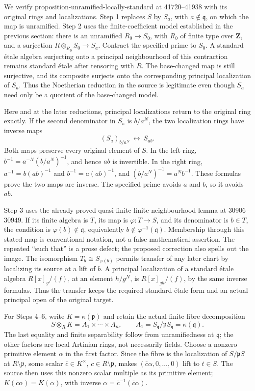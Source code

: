 We verify proposition-unramified-locally-standard at 41720--41938 with its original rings and localizations. Step 1 replaces \(S\) by \(S_a\), with \(a\notin\mathfrak q\), on which the map is unramified. Step 2 uses the finite-coefficient model established in the previous section: there is an unramified \(R_0\to S_0\), with \(R_0\) of finite type over \(\mathbf Z\), and a surjection \(R\otimes_{R_0}S_0\to S_a\). Contract the specified prime to \(S_0\). A standard étale algebra surjecting onto a principal neighbourhood of this contraction remains standard étale after tensoring with \(R\). The base-changed map is still surjective, and its composite surjects onto the corresponding principal localization of \(S_a\). Thus the Noetherian reduction in the source is legitimate even though \(S_a\) need only be a quotient of the base-changed model.

Here and at the later reductions, principal localizations return to the original ring exactly. If the second denominator in \(S_a\) is \(b/a^N\), the two localization rings have inverse maps \[
(S_a)_{b/a^N}\ \longleftrightarrow\ S_{ab}.
\] Both maps preserve every original element of \(S\). In the left ring, \(b^{-1}=a^{-N}(b/a^N)^{-1}\), and hence \(ab\) is invertible. In the right ring, \(a^{-1}=b(ab)^{-1}\) and \(b^{-1}=a(ab)^{-1}\), and \((b/a^N)^{-1}=a^Nb^{-1}\). These formulas prove the two maps are inverse. The specified prime avoids \(a\) and \(b\), so it avoids \(ab\).

Step 3 uses the already proved quasi-finite finite-neighbourhood lemma at 30906--30949. If its finite algebra is \(T\), its map is \(\varphi:T\to S\), and its denominator is \(b\in T\), the condition is \(\varphi(b)\notin\mathfrak q\), equivalently \(b\notin\varphi^{-1}(\mathfrak q)\). Membership through this stated map is conventional notation, not a false mathematical assertion. The repeated ``such that'' is a prose defect; the proposed correction also spells out the image. The isomorphism \(T_b\cong S_{\varphi(b)}\) permits transfer of any later chart by localizing its source at a lift of \(b\). A principal localization of a standard étale algebra \(R[x]_g/(f)\), at an element \(h/g^N\), is \(R[x]_{gh}/(f)\), by the same inverse formulas. Thus the transfer keeps the required standard étale form and an actual principal open of the original target.

For Steps 4--6, write \(K=\kappa(\mathfrak p)\) and retain the actual finite fibre decomposition \[
S\otimes_R K=A_1\times\cdots\times A_n,\qquad
A_1=S_{\mathfrak q}/\mathfrak pS_{\mathfrak q}
    =\kappa(\mathfrak q).
\] The last equality and finite separability follow from unramifiedness at \(\mathfrak q\); the other factors are local Artinian rings, not necessarily fields. Choose a nonzero primitive element \(\alpha\) in the first factor. Since the fibre is the localization of \(S/\mathfrak pS\) at \(R\setminus\mathfrak p\), some scalar \(\bar c\in K^\times\), \(c\in R\setminus\mathfrak p\), makes \((\bar c\alpha,0,\ldots,0)\) lift to \(t\in S\). The source then uses this nonzero scalar multiple as its primitive element; \(K(\bar c\alpha)=K(\alpha)\), with inverse \(\alpha=\bar c^{-1}(\bar c\alpha)\).

